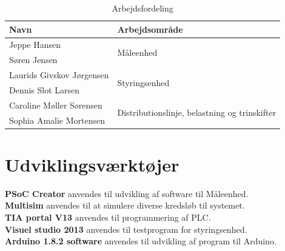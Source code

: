 \begin{table}[H]
	\centering
	\caption{Arbejdsfordeling}
	\label{tab:arbejdsfordeling}
	\begin{tabular}{@{}ll@{}}
		\toprule
		Navn                    & Arbejdsområde                                                  \\ \midrule
		Jeppe Hansen            & \multirow{2}{*}{Måleenhed}                                     \\
		Søren Jensen            &                                                                \\\midrule
		Laurids Givskov Jørgensen       & \multirow{2}{*}{Styringsenhed}                                 \\
		Dennis Slot Larsen            &                                                                \\\midrule
		Caroline Møller Sørensen       & \multirow{2}{*}{Distributionslinje, belastning og trinskifter} \\
		Sophia Amalie Mortensen &                                                                \\ \midrule
	\end{tabular}
\end{table}

\section{Udviklingsværktøjer}

\textbf{PSoC Creator} anvendes til udvikling af software til Måleenhed.\\
\textbf{Multisim} anvendes til at simulere diverse kredsløb til systemet.\\
\textbf{TIA portal V13} anvendes til programmering af PLC.\\
\textbf{Visuel studio 2013} anvendes til testprogram for styringsenhed.\\
\textbf{Arduino 1.8.2 software} anvendes til udvikling af program til Arduino. 

